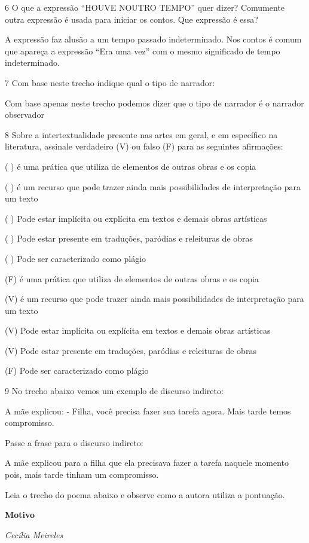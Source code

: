 {\num{6} O que a expressão ``HOUVE NOUTRO TEMPO'' quer dizer? Comumente outra
  expressão é usada para iniciar os contos. Que expressão é essa?

A expressão faz alusão a um tempo passado indeterminado. Nos contos é
comum que apareça a expressão ``Era uma vez'' com o mesmo significado de
tempo indeterminado.

\num{7} Com base neste trecho indique qual o tipo de narrador:

Com base apenas neste trecho podemos dizer que o tipo de narrador é o
narrador observador

\num{8} Sobre a intertextualidade presente nas artes em geral, e em específico
  na literatura, assinale verdadeiro (V) ou falso (F) para as seguintes
  afirmações:

( ) é uma prática que utiliza de elementos de outras obras e os copia


( ) é um recurso que pode trazer ainda mais possibilidades de
interpretação para um texto


( ) Pode estar implícita ou explícita em textos e demais obras
artísticas

( ) Pode estar presente em traduções, paródias e releituras de obras


( ) Pode ser caracterizado como plágio


(F) é uma prática que utiliza de elementos de outras obras e os copia


(V) é um recurso que pode trazer ainda mais possibilidades de
interpretação para um texto


(V) Pode estar implícita ou explícita em textos e demais obras
artísticas

(V) Pode estar presente em traduções, paródias e releituras de obras


(F) Pode ser caracterizado como plágio


\num{9} No trecho abaixo vemos um exemplo de discurso indireto:

A mãe explicou: - Filha, você precisa fazer sua tarefa agora. Mais tarde
temos compromisso.

Passe a frase para o discurso indireto:

A mãe explicou para a filha que ela precisava fazer a tarefa naquele
momento pois, mais tarde tinham um compromisso.

Leia o trecho do poema abaixo e observe como a autora utiliza a
pontuação.

\textbf{Motivo}

\emph{Cecília Meireles}

}
